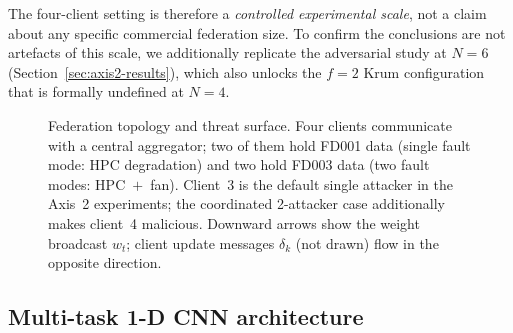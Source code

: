 \documentclass[a4paper,fleqn,doubleblind]{cas-sc}
\begin{document}
The four-client setting is therefore a \emph{controlled
experimental scale}, not a claim about any specific commercial
federation size. To confirm the conclusions are not artefacts of
this scale, we additionally replicate the adversarial study at
$N = 6$ (Section~\ref{sec:axis2-results}), which also unlocks the
$f = 2$ Krum configuration that is formally undefined at $N = 4$.

\begin{figure}[pos=htbp]
\centering
{}
\caption{Federation topology and threat surface. Four clients communicate with a central aggregator; two of them hold FD001 data (single fault mode: HPC degradation) and two hold FD003 data (two fault modes: HPC~$+$~fan). Client~3 is the default single attacker in the Axis~2 experiments; the coordinated 2-attacker case additionally makes client~4 malicious. Downward arrows show the weight broadcast $w_t$; client update messages $\delta_k$ (not drawn) flow in the opposite direction.}
\label{fig:federation}
\end{figure}

\subsection{Multi-task 1-D CNN architecture}
\label{subsec:model}
\end{document}
